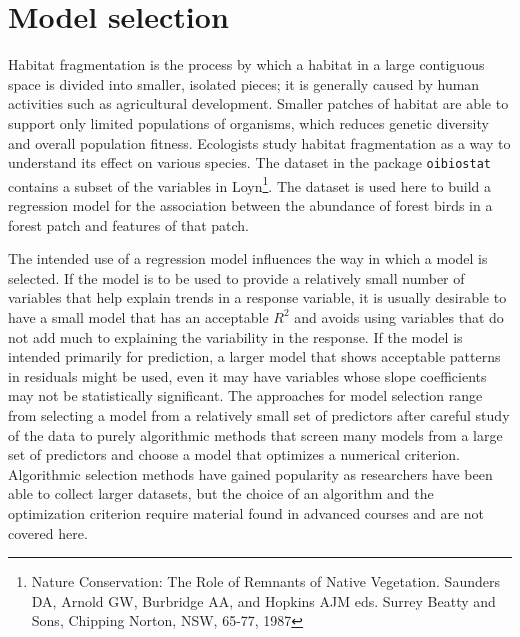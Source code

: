 \section{Model selection}
\label{modelSelection}

Habitat fragmentation is the process by which a habitat in a large contiguous space is divided into smaller, isolated pieces; it is generally caused by human activities such as agricultural development. Smaller patches of habitat are able to support only limited populations of organisms, which reduces genetic diversity and overall population fitness.  Ecologists study habitat fragmentation as a way to understand its effect on various species.  The dataset  in the package \texttt{oibiostat} contains a subset of the variables in Loyn\footnote{Nature Conservation: The Role of Remnants of Native Vegetation. Saunders DA, Arnold GW, Burbridge AA, and Hopkins AJM eds. Surrey Beatty and Sons, Chipping Norton, NSW, 65-77, 1987}. The dataset is used here to build a regression model for the association between the abundance of forest birds in a forest patch and features of that patch. 

The intended use of a regression model influences the way in which a model is selected.  If the model is to be used to provide a relatively small number of variables that help explain trends in a response variable, it is usually desirable to have a small model that has an acceptable $R^2$ and avoids using variables that do not add much to explaining the variability in the response.  If the model is intended primarily for prediction, a larger model that shows acceptable patterns in residuals might be used, even it may have variables whose slope coefficients may not be statistically significant. The approaches for model selection range from selecting a model from a relatively small set of predictors after careful study of the data to purely algorithmic methods that screen many models from a large set of predictors and choose a model that optimizes a numerical criterion.  Algorithmic selection methods have gained popularity as researchers have been able to collect larger datasets, but the choice of an algorithm and the optimization criterion require material found in advanced courses and are not covered here.  


